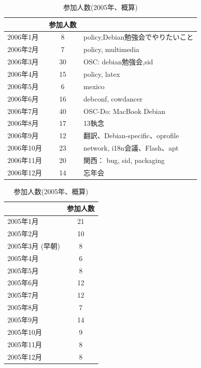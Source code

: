 \documentclass[mingoth,a4paper]{jsarticle}
\begin{document}
 
 \begin{table}[ht]
\begin{minipage}{0.6\hsize}
 \caption{参加人数(2006年)}\label{tab:count2006}
 \begin{center}
  \begin{tabular}{|l|c|l|}
 \hline
 & 参加人数 & \\
 \hline
 2006年1月 & 8 & policy,Debian勉強会でやりたいこと\\
 2006年2月 & 7 & policy, multimedia \\
 2006年3月 & 30 & OSC: debian勉強会,sid \\
 2006年4月 & 15 & policy, latex \\
 2006年5月 & 6 & mexico \\
 2006年6月 & 16 & debconf, cowdancer\\
 2006年7月 & 40 & OSC-Do: MacBook Debian \\
 2006年8月 & 17 & 13執念 \\
 2006年9月 & 12 & 翻訳、Debian-specific、oprofile \\
 2006年10月 & 23 & network, i18n会議、Flash、apt \\
 2006年11月 & 20 & 関西： bug, sid, packaging \\
 2006年12月 & 14 & 忘年会 \\
 \hline
  \end{tabular}
 \end{center}
\end{minipage}
\begin{minipage}{0.35\hsize}
 \caption{参加人数(2005年、概算)}\label{tab:count}
 \begin{center}
  \begin{tabular}{|l|c|}
   & 参加人数 \\
 \hline
   2005年1月 & 21 \\
   2005年2月 & 10 \\
   2005年3月 (早朝)& 8\\
   2005年4月 & 6\\
   2005年5月 & 8\\
   2005年6月 & 12\\
   2005年7月 & 12\\
   2005年8月 & 7\\
   2005年9月 & 14\\
   2005年10月 & 9\\
   2005年11月 & 8\\
   2005年12月 & 8 \\
  \end{tabular}
 \end{center}
\end{minipage}
 \end{table}
\end{document}
